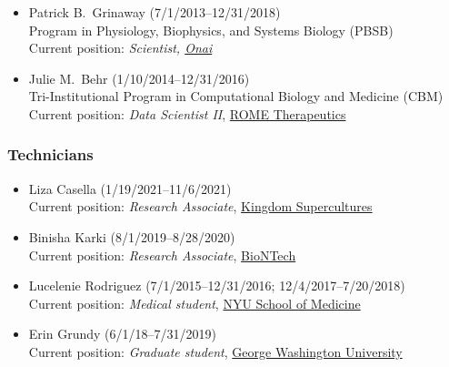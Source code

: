 \documentclass[10pt]{article}
\begin{document}
\begin{itemize}
  \item Patrick B.~Grinaway (7/1/2013--12/31/2018)\\
  Program in Physiology, Biophysics, and Systems Biology (PBSB)\\
  Current position: \emph{Scientist, \href{https://www.onai.com}{Onai}}

  \item Julie M.~Behr (1/10/2014--12/31/2016)\\
  Tri-Institutional Program in Computational Biology and Medicine (CBM)\\
  Current position: \emph{Data Scientist II}, \href{}{ROME Therapeutics} 

\end{itemize}
  
\subsubsection*{Technicians}

\begin{itemize}

  \item Liza Casella (1/19/2021--11/6/2021)\\
  Current position: \emph{Research Associate}, \href{https://www.kingdomsupercultures.com/}{Kingdom Supercultures}
  
  \item Binisha Karki (8/1/2019--8/28/2020)\\
  Current position: \emph{Research Associate}, \href{http://biontech.de}{BioNTech}

  \item Lucelenie Rodriguez (7/1/2015--12/31/2016; 12/4/2017--7/20/2018)\\
  Current position: \emph{Medical student}, \href{https://med.nyu.edu/education}{NYU School of Medicine}

  \item Erin Grundy (6/1/18--7/31/2019)\\
  Current position: \emph{Graduate student}, \href{https://smhs.gwu.edu/ibs/program/microbio-immunology}{George Washington University}
\end{itemize}

\end{document}
